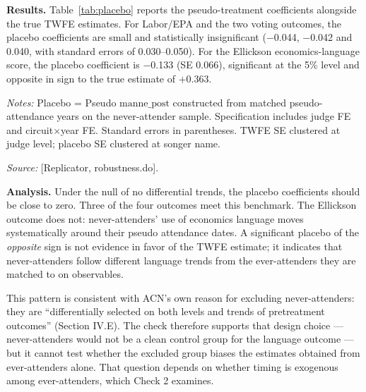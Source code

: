 \documentclass[12pt,a4paper]{article}
\begin{document}
\textbf{Results.} Table~\ref{tab:placebo} reports the pseudo-treatment coefficients alongside the true TWFE estimates. For Labor/EPA and the two voting outcomes, the placebo coefficients are small and statistically insignificant ($-$0.044, $-$0.042 and 0.040, with standard errors of 0.030--0.050). For the Ellickson economics-language score, the placebo coefficient is $-$0.133 (SE 0.066), significant at the 5\% level and opposite in sign to the true estimate of $+$0.363.

\begin{table}[htbp]
\centering
\caption{Never-Attender Placebo Test}
\label{tab:placebo}
\begin{threeparttable}

\begin{tablenotes}
\item {\small \textit{Notes:} Placebo = Pseudo $\text{manne\_post}$ constructed from matched pseudo-attendance years on the never-attender sample. Specification includes judge FE and circuit$\times$year FE. Standard errors in parentheses. TWFE SE clustered at judge level; placebo SE clustered at songer name.}
\item {\small \textit{Source:} [Replicator, robustness.do].}
\end{tablenotes}
\end{threeparttable}
\end{table}

\textbf{Analysis.} Under the null of no differential trends, the placebo coefficients should be close to zero. Three of the four outcomes meet this benchmark. The Ellickson outcome does not: never-attenders' use of economics language moves systematically around their pseudo attendance dates. A significant placebo of the \emph{opposite} sign is not evidence in favor of the TWFE estimate; it indicates that never-attenders follow different language trends from the ever-attenders they are matched to on observables.

This pattern is consistent with ACN's own reason for excluding never-attenders: they are ``differentially selected on both levels and trends of pretreatment outcomes'' (Section IV.E). The check therefore supports that design choice --- never-attenders would not be a clean control group for the language outcome --- but it cannot test whether the excluded group biases the estimates obtained from ever-attenders alone. That question depends on whether timing is exogenous among ever-attenders, which Check 2 examines.
\end{document}

